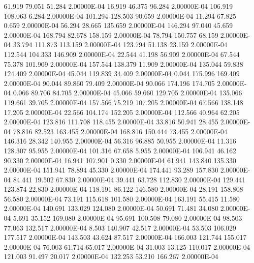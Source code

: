     61.919    79.051    51.284  2.00000E-04
    16.919    46.375    96.284  2.00000E-04
   106.919   108.063     6.284  2.00000E-04
   101.294   128.503    90.659  2.00000E-04
    11.294    67.825     0.659  2.00000E-04
    56.294    28.665   135.659  2.00000E-04
   146.294    97.040    45.659  2.00000E-04
   168.794    82.678   158.159  2.00000E-04
    78.794   150.757    68.159  2.00000E-04
    33.794   111.873   113.159  2.00000E-04
   123.794    51.138    23.159  2.00000E-04
   112.544   104.333   146.909  2.00000E-04
    22.544    41.198    56.909  2.00000E-04
    67.544    75.378   101.909  2.00000E-04
   157.544   138.379    11.909  2.00000E-04
   135.044    59.838   124.409  2.00000E-04
    45.044   119.839    34.409  2.00000E-04
     0.044   175.996   169.409  2.00000E-04
    90.044    89.860    79.409  2.00000E-04
    90.066   174.196   174.705  2.00000E-04
     0.066    89.706    84.705  2.00000E-04
    45.066    59.660   129.705  2.00000E-04
   135.066   119.661    39.705  2.00000E-04
   157.566    75.219   107.205  2.00000E-04
    67.566   138.148    17.205  2.00000E-04
    22.566   104.174   152.205  2.00000E-04
   112.566    40.964    62.205  2.00000E-04
   123.816   111.708   118.455  2.00000E-04
    33.816    50.941    28.455  2.00000E-04
    78.816    82.523   163.455  2.00000E-04
   168.816   150.444    73.455  2.00000E-04
   146.316    28.342   140.955  2.00000E-04
    56.316    96.885    50.955  2.00000E-04
    11.316   128.307    95.955  2.00000E-04
   101.316    67.658     5.955  2.00000E-04
   106.941    46.162    90.330  2.00000E-04
    16.941   107.901     0.330  2.00000E-04
    61.941   143.840   135.330  2.00000E-04
   151.941    78.894    45.330  2.00000E-04
   174.441    93.289   157.830  2.00000E-04
    84.441    19.502    67.830  2.00000E-04
    39.441    63.728   112.830  2.00000E-04
   129.441   123.874    22.830  2.00000E-04
   118.191    86.122   146.580  2.00000E-04
    28.191   158.808    56.580  2.00000E-04
    73.191   115.618   101.580  2.00000E-04
   163.191    55.415    11.580  2.00000E-04
   140.691   133.029   124.080  2.00000E-04
    50.691    71.481    34.080  2.00000E-04
     5.691    35.152   169.080  2.00000E-04
    95.691   100.508    79.080  2.00000E-04
    98.503    77.063   132.517  2.00000E-04
     8.503   140.907    42.517  2.00000E-04
    53.503   106.029   177.517  2.00000E-04
   143.503    43.624    87.517  2.00000E-04
   166.003   121.744   155.017  2.00000E-04
    76.003    61.714    65.017  2.00000E-04
    31.003    13.125   110.017  2.00000E-04
   121.003    91.497    20.017  2.00000E-04
   132.253    53.210   166.267  2.00000E-04
